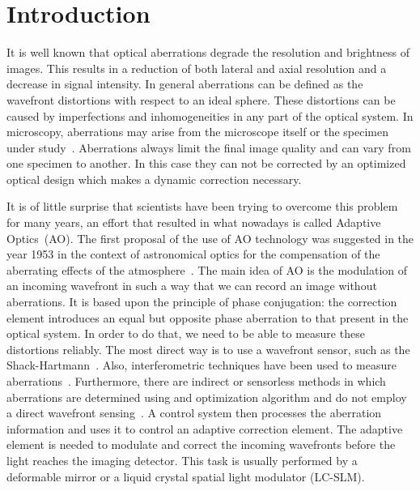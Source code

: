 \section{Introduction}
\label{sec:Introduction}

It is well known that optical aberrations degrade the resolution and brightness of images. This results in a reduction of both lateral and axial resolution and a decrease in signal intensity. In general aberrations can be defined as the wavefront distortions with respect to an ideal sphere. These distortions can be caused by imperfections and inhomogeneities in any part of the optical system. In microscopy, aberrations may arise from the microscope itself or the specimen under study~\cite{AOM_basic_ref}. Aberrations always limit the final image quality and can vary from one specimen to another. In this case they can not be corrected by an optimized optical design which makes a dynamic correction necessary. 
 
It is of little surprise that scientists have been trying to overcome this problem for many years, an effort that resulted in what nowadays is called Adaptive Optics~(AO). The first proposal of the use of AO technology was suggested in the year 1953 in the context of astronomical optics for the compensation of the aberrating effects of the atmosphere~\cite{Babcock1953}. The main idea of AO is the modulation of an incoming wavefront in such a way that we can record an image without aberrations. It is based upon the principle of phase conjugation: the correction element introduces an equal but opposite phase aberration to that present in the optical system. In order to do that, we need to be able to measure these distortions reliably. The most direct way is to use a wavefront sensor, such as the Shack-Hartmann~\cite{Principles_HS, History_HS}. Also, interferometric techniques have been used to measure aberrations~\cite{Interferometric_methods}. Furthermore, there are indirect or sensorless methods in which aberrations are determined using and optimization algorithm and do not employ a direct  wavefront sensing~\cite{WF_sensorless}. A control system then processes the aberration information and uses it to control an adaptive correction element. The adaptive element is needed to modulate and correct the incoming wavefronts before the light reaches the imaging detector. This task is usually performed by a deformable mirror or a liquid crystal spatial light modulator (LC-SLM). 

